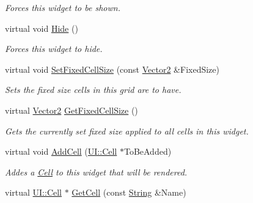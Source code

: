 \begin{DoxyCompactItemize}
\begin{DoxyCompactList}\small\item\em Forces this widget to be shown. \item\end{DoxyCompactList}\item 
\hypertarget{classphys_1_1UI_1_1CellGrid_a8f1ea23b55724f3346a6c32c87f4eabc}{
virtual void \hyperlink{classphys_1_1UI_1_1CellGrid_a8f1ea23b55724f3346a6c32c87f4eabc}{Hide} ()}
\label{classphys_1_1UI_1_1CellGrid_a8f1ea23b55724f3346a6c32c87f4eabc}

\begin{DoxyCompactList}\small\item\em Forces this widget to hide. \item\end{DoxyCompactList}\item 
virtual void \hyperlink{classphys_1_1UI_1_1CellGrid_ad8a6d111b1906b0eb165fcedc0917452}{SetFixedCellSize} (const \hyperlink{classphys_1_1Vector2}{Vector2} \&FixedSize)
\begin{DoxyCompactList}\small\item\em Sets the fixed size cells in this grid are to have. \item\end{DoxyCompactList}\item 
virtual \hyperlink{classphys_1_1Vector2}{Vector2} \hyperlink{classphys_1_1UI_1_1CellGrid_a7106972be4c03ac453894fcb7ef4782f}{GetFixedCellSize} ()
\begin{DoxyCompactList}\small\item\em Gets the currently set fixed size applied to all cells in this widget. \item\end{DoxyCompactList}\item 
virtual void \hyperlink{classphys_1_1UI_1_1CellGrid_ac4f29519b3e2bca1fa146b2a9a20ec61}{AddCell} (\hyperlink{classphys_1_1UI_1_1Cell}{UI::Cell} $\ast$ToBeAdded)
\begin{DoxyCompactList}\small\item\em Addes a \hyperlink{classphys_1_1UI_1_1Cell}{Cell} to this widget that will be rendered. \item\end{DoxyCompactList}\item 
virtual \hyperlink{classphys_1_1UI_1_1Cell}{UI::Cell} $\ast$ \hyperlink{classphys_1_1UI_1_1CellGrid_a563d2fcfdb017579633727094a3176f3}{GetCell} (const \hyperlink{namespacephys_aa03900411993de7fbfec4789bc1d392e}{String} \&Name)

\end{DoxyCompactItemize}

